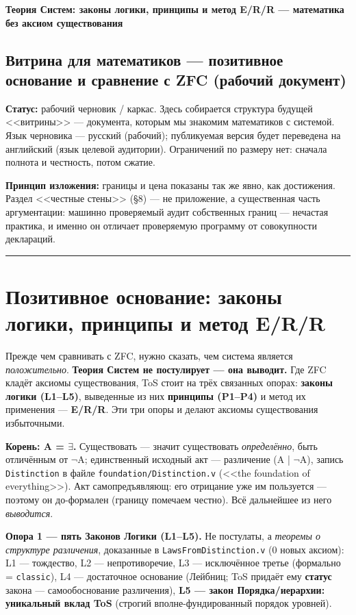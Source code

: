 \documentclass[11pt,a4paper]{article}
\begin{document}
\begin{center}{\LARGE\bfseries Теория Систем: законы логики, принципы и метод E/R/R --- математика без аксиом существования}\end{center}
\vspace{0.5em}

\subsection*{Витрина для математиков --- позитивное основание и сравнение с ZFC (рабочий документ)}

\textbf{Статус:} рабочий черновик / каркас. Здесь собирается структура будущей <<витрины>> --- документа, которым мы знакомим математиков с системой. Язык черновика --- русский (рабочий); публикуемая версия будет переведена на английский (язык целевой аудитории). Ограничений по размеру нет: сначала полнота и честность, потом сжатие.

\textbf{Принцип изложения:} границы и цена показаны так же явно, как достижения. Раздел <<честные стены>> (\S{}8) --- не приложение, а существенная часть аргументации: машинно проверяемый аудит собственных границ --- нечастая практика, и именно он отличает проверяемую программу от совокупности деклараций.

\bigskip\hrule\bigskip

\section{Позитивное основание: законы логики, принципы и метод E/R/R}

Прежде чем сравнивать с ZFC, нужно сказать, чем система является \emph{положительно}. \textbf{Теория Систем не постулирует --- она выводит.} Где ZFC кладёт аксиомы существования, ToS стоит на трёх связанных опорах: \textbf{законы логики (L1--L5)}, выведенные из них \textbf{принципы (P1--P4)} и метод их применения --- \textbf{E/R/R}. Эти три опоры и делают аксиомы существования избыточными.

\textbf{Корень: A = $\exists$.} Существовать --- значит существовать \emph{определённо}, быть отличённым от $\neg$A; единственный исходный акт --- различение (A | $\neg$A), запись \texttt{Distinction} в файле \texttt{foundation/\allowbreak{}Distinction.v} (<<the foundation of everything>>). Акт самопредъявляющ: его отрицание уже им пользуется --- поэтому он до-формален (границу помечаем честно). Всё дальнейшее из него \emph{выводится}.

\textbf{Опора 1 --- пять Законов Логики (L1--L5).} Не постулаты, а \emph{теоремы о структуре различения}, доказанные в \texttt{Laws\allowbreak{}From\allowbreak{}Distinction.v} (0 новых аксиом): L1 --- тождество, L2 --- непротиворечие, L3 --- исключённое третье (формально = \texttt{classic}), L4 --- достаточное основание (Лейбниц; ToS придаёт ему \textbf{статус} закона --- самообоснование различения), \textbf{L5 --- закон Порядка/иерархии: уникальный вклад ToS} (строгий вполне-фундированный порядок уровней).
\end{document}
